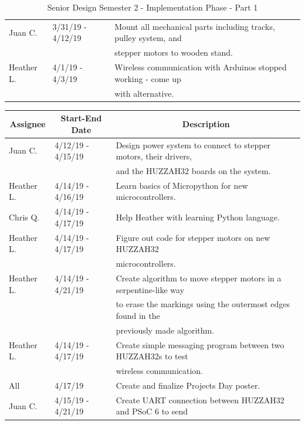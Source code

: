 \begin{table} [H]
\begin{tabular}{|l|l|l|}
		\hline
		Juan C. & 3/31/19 - 4/12/19 	& Mount all mechanical parts including tracks, pulley system, and \\
				&						& stepper motors to wooden stand. \\
		\hline
		Heather L. & 4/1/19 - 4/3/19 	& Wireless communication with Arduinos stopped working - come up \\  	&						& with alternative. \\
		\hline
	\end{tabular} 
\caption{Senior Design Semester 2 - Implementation Phase - Part 1}
\label{table:4}
\end{table}		
		
\begin{table} [H]	
	\normalsize
	\centering
	\begin{tabular}{|l|l|l|}
		\hline
		\multicolumn{1}{|c|}{\textbf{Assignee}} & \multicolumn{1}{|c|}{\textbf{Start-End Date}} & \multicolumn{1}{|c|}{\textbf{Description}} \\
		\hline			
		Juan C. & 4/12/19 - 4/15/19 	& Design power system to connect to stepper motors, their drivers, \\
		&						& and the HUZZAH32 boards on the system. \\
		\hline
		Heather L. & 4/14/19 - 4/16/19 	& Learn basics of Micropython for new microcontrollers. \\
				\hline
		Chris Q. & 4/14/19 - 4/17/19 	& Help Heather with learning Python language. \\
		\hline
		Heather L. & 4/14/19 - 4/17/19 	& Figure out code for stepper motors on new HUZZAH32 \\
					&					& microcontrollers. \\
		\hline
		Heather L. & 4/14/19 - 4/21/19 	& Create algorithm to move stepper motors in a serpentine-like way \\
					&					& to erase the markings using the outermost edges found in the \\
					&					& previously made algorithm. \\
		\hline
		Heather L. & 4/14/19 - 4/17/19 	& Create simple messaging program between two HUZZAH32s to test \\ 			&					& wireless communication. \\
		\hline
		All & 4/17/19 					& Create and finalize Projects Day poster. \\
		\hline
		Juan C.   & 4/15/19 - 4/21/19   & Create UART connection between HUZZAH32 and PSoC 6 to send \\

\end{tabular}
\end{table}
